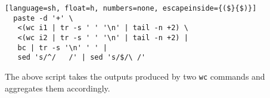 \documentclass[sigplan,10pt,review,anonymous]{acmart}
\newcommand{\ttt}[1]{\texttt{\small #1}}
\newcommand{\nv}[1]{[{\color{cyan}#1 --- nv}]}
\newcommand{\kk}[1]{[{\color{magenta}#1 --- kk}]}
\begin{document}
\begin{lstlisting}[language=sh, float=h, numbers=none, escapeinside={($}{$)}]
  paste -d '+' \
   <(wc i1 | tr -s ' ' '\n' | tail -n +2) \
   <(wc i2 | tr -s ' ' '\n' | tail -n +2) |
   bc | tr -s '\n' ' ' |
   sed 's/^/   /' | sed 's/$/\ /'
\end{lstlisting}

The above script takes the outputs produced by two \ttt{wc} commands
and aggregates them accordingly.





% 
% 
% 
% 
% 
%
\end{document}
